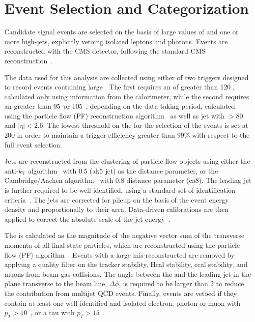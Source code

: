 \section{Event Selection and Categorization}\label{sec:selection}

Candidate signal events are selected on the basis of large values of \ETm and
one or more high-\pt jets, explicitly vetoing isolated leptons and photons.
Events are reconstructed with the CMS detector, following the standard CMS
reconstruction~\cite{CMSdetector}. 

The data used for this analysis are collected using either of two triggers
designed to record events containing large \ETm. The first requires an \ETm of
greater than 120 \gev, calculated only using information from the calorimeter,
while the second requires an \ETm greater than 95~\gev or 105~\gev, depending on
the data-taking period, calculated using  the particle flow (PF) reconstruction
algorithm~\cite{CMS-PAS-PFT-09-001} as well as jet with \pt$>80$ \gev and
$|\eta|<2.6$.  The lowest threshold on the \ETm for the selection of the events
is set at 200 \gev in order to maintain a trigger efficiency greater than $99$\%
with respect to the full event selection. 

Jets are reconstructed from the clustering of particle flow objects using either
the anti-$k_{\textrm{T}}$ algorithm~\cite{Cacciari:2008gp} with 0.5 (ak5 jet) as
the distance parameter,  or the Cambridge/Aachen algorithm~\cite{cajets} with
0.8 distance parameter (ca8). The leading jet is further required to be well
identified, using a standard set of identification criteria~\cite{jec}. The jets
are corrected for pileup on the basis of the event energy density and
proportionally to their area. Data-driven calibrations are then applied to
correct the absolute scale of the jet energy~\cite{jec}.

The \ETm is calculated as the magnitude of the negative vector sum of the
transverse momenta of all final state particles, which are reconstructed using
the particle-flow (PF) algorithm~\cite{CMS-PAS-PFT-09-001}.  Events with a large
mis-reconstructed \ETm are removed by applying a quality filter on the tracker
stability, Hcal stability, ecal stability, and muons from beam gas collisions.
The angle between the \ETm and the leading jet in the plane transverse to the
beam line, $\Delta\phi$, is required to be larger than 2 to reduce the
contribution from multijet QCD events.  Finally, events are vetoed if they
contain at least one well-identified and isolated electron, photon or muon with
$p_T>10$~\gev, or a tau with $p_T>15$~\gev.

